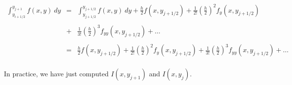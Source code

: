 \documentclass{article}
\begin{document}
\[
    \begin{array}{rcl}
        \displaystyle
        \int_{y_{i+1/2}}^{y_{j+1}}
        f(x, y) \: dy	&=&	\displaystyle
                            \int_{y_{j+1/2}}^{y_{j+1/2}}
                            f(x, y) \: dy
                            +
                            \frac{h}{2}
                            f(x, y_{j+1/2})
                            +
                            \frac{1}{2!}
                            \left(
                            \frac{h}{2}
                            \right)^2
                            f_y(x, y_{j+1/2})
                            \\
                        & &	\\
                        &+&	\displaystyle
                            \frac{1}{3!}
                            \left(
                            \frac{h}{2}
                            \right)^3
                            f_{yy}(x, y_{j+1/2})
                            + \ldots
                            \\
                        & &	\\
                        &=&	\displaystyle
                            \frac{h}{2}
                            f(x, y_{j+1/2})
                            +
                            \frac{1}{2!}
                            \left(
                            \frac{h}{2}
                            \right)^2
                            f_y(x, y_{j+1/2})
                            +
                            \frac{1}{3!}
                            \left(
                            \frac{h}{2}
                            \right)^3
                            f_{yy}(x, y_{j+1/2})
                            +
                            \ldots
                            \\
    \end{array}
\]

\noindent
In practice, we have just computed $I(x,y_{j+1})$ and $I(x, y_j)$.
\end{document}
